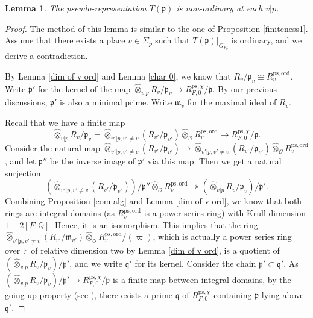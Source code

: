 \documentclass[a4paper, 12pt]{amsart}
\newtheorem{lem}[thm]{Lemma}
\def\ps{\mathrm{ps}}
\def\ord{\mathrm{ord}}
\newcommand{\F}{\mathbb{F}}
\newcommand{\Q}{\mathbb{Q}}
\newcommand{\cO}{\mathcal{O}}
\newcommand{\kq}{\mathfrak{q}}
\newcommand{\kp}{\mathfrak{p}}
\newcommand{\km}{\mathfrak{m}}
\begin{document}
    \begin{lem}\label{min is non-ord}
    	The pseudo-representation $T(\kp) $ is non-ordinary at each $v|p$.
    \end{lem}
    
    \begin{proof}
    	The method of this lemma is similar to the one of Proposition \ref{finiteness1}. Assume that there exists a place $v\in \Sigma_p$ such that $T(\kp)|_{G_{F_v}}$ is ordinary, and we derive a contradiction.
    	
    	 By Lemma \ref{dim of v ord} and Lemma \ref{char 0}, we know that $R_v/\kp_v\cong R_v^{\ps, \ord}$. Write $\kp'$ for the kernel of the map $\widehat{\otimes}_{v |p} R_{v}/\kp_v \to R_{F, 0}^{\ps, \chi}/\kp$. By our previous discussions, $\kp'$ is also a minimal prime. Write $\km_v$ for the maximal ideal of $R_v$.
    	
    	 Recall that we have a finite map $$\widehat{\otimes}_{v |p} R_{v}/\kp_v= \widehat{\otimes}_{v' |p, v' \ne v} (R_{v'}/\kp_{v'}) \widehat{\otimes}_{\cO} R_v^{\ps, \ord} \to R_{F, 0}^{\ps, \chi}/\kp.$$
    	Consider the natural map $ \widehat{\otimes}_{v' |p, v' \ne v} (R_{v'}/\kp_{v'}) \to \widehat{\otimes}_{v' |p, v' \ne v} (R_{v'}/\kp_{v'}) \widehat{\otimes}_{\cO} R_v^{\ps, \ord}$, and let $\kp''$ be the inverse image of $\kp'$ via this map. Then we get a natural surjection $$(\widehat{\otimes}_{v' |p, v' \ne v} (R_{v'}/\kp_{v'}))/\kp'' \widehat{\otimes}_{\cO} R_v^{\ps, \ord} \twoheadrightarrow (\widehat{\otimes}_{v |p} R_{v}/\kp_v)/\kp'. $$
    	Combining Proposition \ref{com alg} and Lemma \ref{dim of v ord}, we know that both rings are integral domains (as $ R_v^{\ps, \ord}$ is a power series ring) with Krull dimension $1+2[F:\Q]$. Hence, it is an isomorphism. This implies that the ring $\widehat{\otimes}_{v' |p, v' \ne v} (R_{v'}/\km_{v'}) \widehat{\otimes}_{\cO} R_v^{\ps, \ord}/(\varpi)$, which is actually a power series ring over $\F$ of relative dimension two by Lemma \ref{dim of v ord}, is a quotient of $(\widehat{\otimes}_{v |p} R_{v}/\kp_v)/\kp' $, and we write $\kq'$ for its kernel. Consider the chain $\kp' \subset \kq'$. As $(\widehat{\otimes}_{v |p} R_{v}/\kp_v)/\kp' \to R_{F, 0}^{\ps, \chi}/\kp$ is a finite map between integral domains, by the going-up property (see \cite[Theorem 5.E]{matsumura80}), there exists a prime $\kq$ of $R_{F, 0}^{\ps, \chi}$ containing $ \kp$ lying above $\kq'$.
    	

\end{proof}
\end{document}
